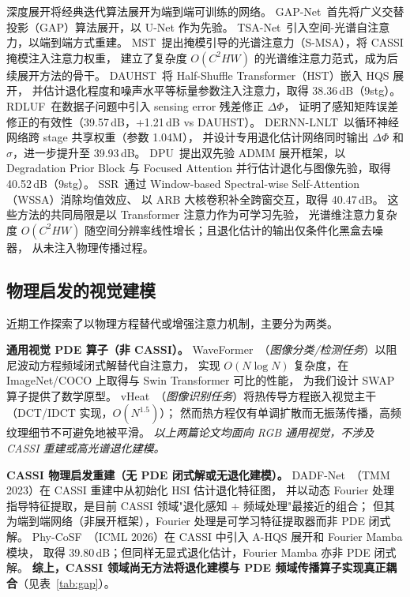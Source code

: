 \documentclass[a4paper,11pt,twocolumn]{ctexart}
\newcommand{\swap}{\textsc{SWAP}}
\begin{document}
深度展开将经典迭代算法展开为端到端可训练的网络。
GAP-Net~\citep{meng2020gapnet}首先将广义交替投影（GAP）算法展开，以 U-Net 作为先验。
TSA-Net~\citep{meng2020tsanet}引入空间-光谱自注意力，以端到端方式重建。
MST~\citep{cai2022mst}提出掩模引导的光谱注意力（S-MSA），将 CASSI 掩模注入注意力权重，
建立了复杂度 $O(C^2HW)$ 的光谱维注意力范式，成为后续展开方法的骨干。
DAUHST~\citep{cai2022dauhst}将 Half-Shuffle Transformer（HST）嵌入 HQS 展开，
并估计退化程度和噪声水平等标量参数注入注意力，取得 38.36\,dB（9stg）。
RDLUF~\citep{dong2023rdluf}在数据子问题中引入 sensing error 残差修正 $\Delta\Phi$，
证明了感知矩阵误差修正的有效性（39.57\,dB，+1.21\,dB vs DAUHST）。
DERNN-LNLT~\citep{dong2024dernnlnlt}以循环神经网络跨 stage 共享权重（参数 1.04M），
并设计专用退化估计网络同时输出 $\Delta\Phi$ 和 $\sigma$，进一步提升至 39.93\,dB。
DPU~\citep{zhang2024dpu}提出双先验 ADMM 展开框架，以 Degradation Prior Block 与 Focused Attention 并行估计退化与图像先验，取得 40.52\,dB（9stg）。
SSR~\citep{zhang2024ssr}通过 Window-based Spectral-wise Self-Attention（WSSA）消除均值效应、
以 ARB 大核卷积补全跨窗交互，取得 40.47\,dB。
这些方法的共同局限是以 Transformer 注意力作为可学习先验，
光谱维注意力复杂度 $O(C^2HW)$ 随空间分辨率线性增长；且退化估计的输出仅条件化黑盒去噪器，
从未注入物理传播过程。

\subsection{物理启发的视觉建模}

近期工作探索了以物理方程替代或增强注意力机制，主要分为两类。

\textbf{通用视觉 PDE 算子（非 CASSI）。}
WaveFormer~\citep{shu2026waveformer}（\emph{图像分类/检测任务}）以阻尼波动方程频域闭式解替代自注意力，
实现 $O(N\log N)$ 复杂度，在 ImageNet/COCO 上取得与 Swin Transformer 可比的性能，
为我们设计 \swap{} 算子提供了数学原型。
vHeat~\citep{wang2024vheat}（\emph{图像识别任务}）将热传导方程嵌入视觉主干（DCT/IDCT 实现，$O(N^{1.5})$）；
然而热方程仅有单调扩散而无振荡传播，高频纹理细节不可避免地被平滑。
\emph{以上两篇论文均面向 RGB 通用视觉，不涉及 CASSI 重建或高光谱退化建模。}

\textbf{CASSI 物理启发重建（无 PDE 闭式解或无退化建模）。}
DADF-Net~\citep{dong2023dadfnet}（TMM 2023）在 CASSI 重建中从初始化 HSI 估计退化特征图，
并以动态 Fourier 处理指导特征提取，是目前 CASSI 领域"退化感知 + 频域处理"最接近的组合；
但其为端到端网络（非展开框架），Fourier 处理是可学习特征提取器而非 PDE 闭式解。
Phy-CoSF~\citep{chen2026phycosf}（ICML 2026）在 CASSI 中引入 A-HQS 展开和 Fourier Mamba 模块，
取得 39.80\,dB；但同样无显式退化估计，Fourier Mamba 亦非 PDE 闭式解。
\textbf{综上，CASSI 领域尚无方法将退化建模与 PDE 频域传播算子实现真正耦合}（见表~\ref{tab:gap}）。
\end{document}
